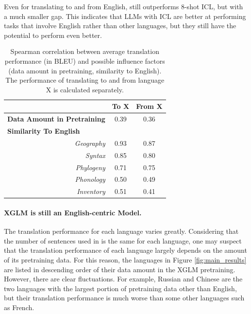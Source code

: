 Even for translating to and from English, \method still outperforms 8-shot ICL, but with a much smaller gap. This indicates that LLMs with ICL are better at performing tasks that involve English rather than other languages, but they still have the potential to perform even better. 

\begin{table}[t]
\centering
\begin{tabular}{@{}rcc@{}}
\toprule
\multicolumn{1}{l}{}                           & \textbf{To X} & \textbf{From X} \\ \midrule
\multicolumn{1}{l}{\textbf{Data Amount in Pretraining}} & 0.39          & 0.36            \\ \midrule
\multicolumn{3}{l}{\textbf{Similarity To English}}                                        \\
\textit{Geography}                                      & 0.93          & 0.87            \\
\textit{Syntax}                                         & 0.85          & 0.80            \\
\textit{Phylogeny}                                      & 0.71          & 0.75            \\
\textit{Phonology}                                      & 0.50          & 0.49            \\
\textit{Inventory}                                      & 0.51          & 0.41            \\ \bottomrule
\end{tabular}
\caption{Spearman correlation between average translation performance (in BLEU) and possible influence factors (data amount in pretraining, similarity to English). The performance of translating to and from language X is calculated separately.}
\label{tab:factor}
\end{table}

\paragraph{XGLM is still an English-centric Model.}
The translation performance for each language varies greatly. Considering that the number of sentences used in \method is the same for each language, one may suspect that the translation performance of each language largely depends on the amount of its pretraining data. For this reason, the languages in Figure \ref{fig:main_results} are listed in descending order of their data amount in the XGLM pretraining. However, there are clear fluctuations. For example, Russian and Chinese are the two languages with the largest portion of pretraining data other than English, but their translation performance is much worse than some other languages such as French. 


